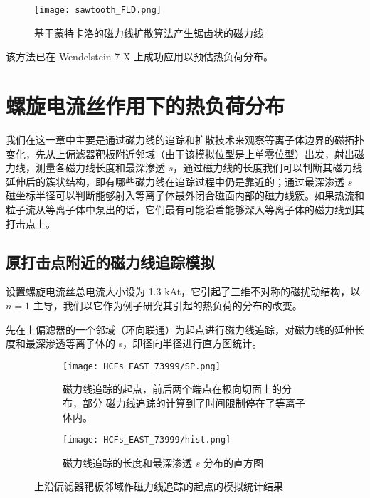 
\begin{figure}[htbp]
    \centering
    \texttt{[image: sawtooth\_FLD.png]}
    \caption{基于蒙特卡洛的磁力线扩散算法产生锯齿状的磁力线}
\end{figure}




该方法已在 Wendelstein 7-X 上成功应用以预估热负荷分布。

\section{螺旋电流丝作用下的热负荷分布}
我们在这一章中主要是通过磁力线的追踪和扩散技术来观察等离子体边界的磁拓扑变化，先从上偏滤器靶板附近邻域（由于该模拟位型是上单零位型）出发，射出磁力线，测量各磁力线长度和最深渗透 $s$，通过磁力线的长度我们可以判断其磁力线延伸后的簇状结构，即有哪些磁力线在追踪过程中仍是靠近的；通过最深渗透 $s$ 磁坐标半径可以判断能够射入等离子体最外闭合磁面内部的磁力线簇。如果热流和粒子流从等离子体中泵出的话，它们最有可能沿着能够深入等离子体的磁力线到其打击点上。

\subsection{原打击点附近的磁力线追踪模拟}
设置螺旋电流丝总电流大小设为 1.3 kAt，它引起了三维不对称的磁扰动结构，以 $n=1$ 主导，我们以它作为例子研究其引起的热负荷的分布的改变。
  
先在上偏滤器的一个邻域（环向联通）为起点进行磁力线追踪，对磁力线的延伸长度和最深渗透等离子体的 s，即径向半径进行直方图统计。

\begin{figure}[htbp]
  \centering
  
  \begin{subfigure}{0.4\textwidth}
    \texttt{[image: HCFs\_EAST\_73999/SP.png]}
    \caption{磁力线追踪的起点，前后两个端点在极向切面上的分布，部分 磁力线追踪的计算到了时间限制停在了等离子体内。}
  \end{subfigure}%
  \begin{subfigure}{0.57\textwidth}
    \texttt{[image: HCFs\_EAST\_73999/hist.png]}
    \caption{磁力线追踪的长度和最深渗透 $s$ 分布的直方图}
  \end{subfigure}%
  \caption{上沿偏滤器靶板邻域作磁力线追踪的起点的模拟统计结果}
\end{figure}



